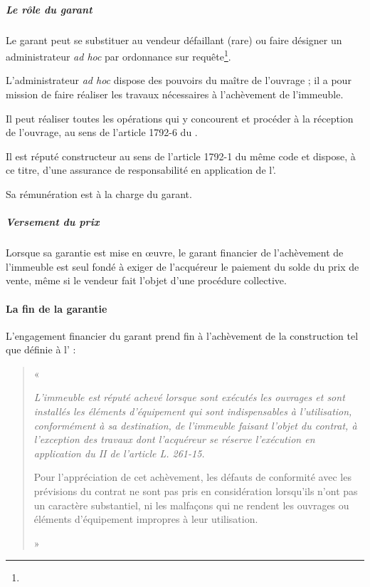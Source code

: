 				\subparagraph{Le rôle du garant}

				Le garant peut se substituer au vendeur défaillant (rare) ou faire désigner un administrateur \emph{ad hoc} par ordonnance sur requête\footnote{}.

				L'administrateur \emph{ad hoc} dispose des pouvoirs du maître de l'ouvrage ; il a pour mission de faire réaliser les travaux nécessaires à l'achèvement de l'immeuble.

				Il peut réaliser toutes les opérations qui y concourent et procéder à la réception de l'ouvrage, au sens de l'article 1792-6 du \cciv.

				Il est réputé constructeur au sens de l'article 1792-1 du même code et dispose, à ce titre, d'une assurance de responsabilité en application de l'.

				Sa rémunération est à la charge du garant.

				\subparagraph{Versement du prix}

				Lorsque sa garantie est mise en œuvre, le garant financier de l'achèvement de l'immeuble est seul fondé à exiger de l'acquéreur le paiement du solde du prix de vente, même si le vendeur fait l'objet d'une procédure collective.


			\paragraph{La fin de la garantie}

			L’engagement financier du garant prend fin à l’achèvement de la construction tel que définie à l' :

			\begin{quote}
				« {\itshape L’immeuble \lips est réputé achevé \lips lorsque sont exécutés les ouvrages et sont installés les éléments d’équipement qui sont indispensables à l’utilisation, conformément à sa destination, de l’immeuble faisant l’objet du contrat, à l'exception des travaux dont l'acquéreur se réserve l'exécution en application du II de l'article L. 261-15.

				Pour l’appréciation de cet achèvement, les défauts de conformité avec les prévisions du contrat ne sont pas pris en considération lorsqu’ils n’ont pas un caractère substantiel, ni les malfaçons qui ne rendent les ouvrages ou éléments d’équipement impropres à leur utilisation.} »
			\end{quote}

